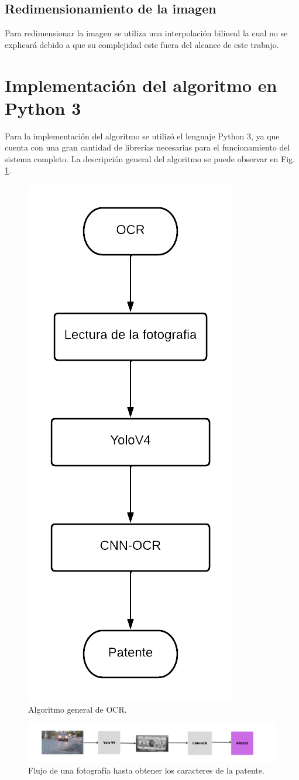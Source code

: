 \subsection{Redimensionamiento de la imagen}

Para redimensionar la imagen se utiliza una interpolación bilineal la cual no se explicará debido a que su complejidad este fuera del alcance de este trabajo.

\section{Implementación del algoritmo en Python 3}

Para la implementación del algoritmo se utilizó el lenguaje Python 3, ya que cuenta con una gran cantidad de librerías necesarias para el funcionamiento del sistema completo. La descripción general del algoritmo se puede observar en Fig. \ref{fig:algoritmo-ocr}.

\begin{figure}[bth]
    \centering
    \includegraphics[width=.25\textwidth]{imgs/flujo-algoritmo-ocr.png}
    \caption{Algoritmo general de OCR.}
    \label{fig:algoritmo-ocr}
\end{figure}


\begin{figure}[bth]
    \centering
    \includegraphics[width=\textwidth]{imgs/pic-to-text.png}
    \caption{Flujo de una fotografía hasta obtener los caracteres de la patente.}
    \label{fig:pic-to-text}
\end{figure}

